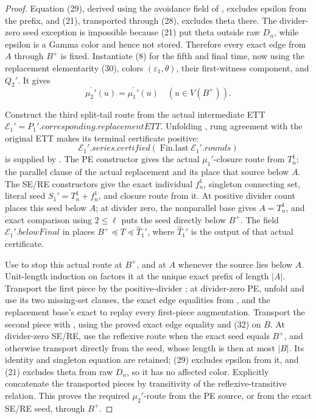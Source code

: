 \begin{proof}
Equation (29), derived using the avoidance field of
, excludes epsilon from the prefix, and (21),
transported through (28), excludes theta there.  The divider-zero seed exception is
impossible because (21) put theta outside raw \(D_n\), while epsilon is a
Gamma color and hence not stored.  Therefore every exact edge from \(A\)
through \(B^+\) is fixed.  Instantiate (8) for the fifth and final time,
now using the replacement elementarity (30), colors
\((\varepsilon_1,\theta)\), their first-witness component, and \(Q_2'\).
It gives
\[
 \overline{\mu_2'}(u)=\overline{\mu_1'}(u)
                           \quad(u\in V(B^+)).                 \tag{32}
\]

Construct the third split-tail route from the actual intermediate ETT
\(\mathcal E_1'=P_1'.\mathit{corresponding}.\mathit{replacementETT}\).
Unfolding , rung agreement with
the original ETT makes its terminal certificate positive:
\[
 \mathcal E_1'.\mathit{series}.\mathit{certified}
       (\operatorname{Fin.last}\mathcal E_1'.\mathit{rounds})
\]
is supplied by .  The PE constructor gives the
actual \(\mu_1'\)-closure route from \(T_n^1\); the parallel clause of
the actual replacement  and its
 place that source below \(A\).  The SE/RE
constructors give the exact individual \(f_n^1\), singleton connecting
set, literal seed \(S_1'=T_n^1+f_n^1\), and closure route from it.  At
positive divider count  places
this seed below \(A\); at divider zero, the nonparallel base gives
\(A=T_n^1\), and exact comparison using \(2\leq\ell\) puts the seed
directly below \(B^+\).  The field
\(\mathcal E_1'.\mathit{belowFinal}\) in
 places
\(B^+\preccurlyeq T\preccurlyeq\widehat T_1'\), where
\(\widehat T_1'\) is the output of that actual certificate.

Use  to stop this actual
route at \(B^+\), and at \(A\) whenever the source lies below \(A\).
Unit-length induction on  factors
it at the unique exact prefix of length \(|A|\).  Transport the first
piece by the positive-divider ; at
divider-zero PE, unfold  and use its two
 missing-set clauses, the exact edge equalities from
, and the replacement base's exact
 to replay every first-piece augmentation.
Transport the
second piece with
, using the
proved exact edge equality and (32) on \(B\).  At divider-zero SE/RE, use
the reflexive route when the exact seed equals \(B^+\), and otherwise
transport directly from the seed, whose length is then at most \(|B|\).
Its identity and singleton equation are retained; (29) excludes epsilon
from it, and (21) excludes theta from raw \(D_n\), so it has no affected
color.  Explicitly
concatenate the transported pieces by transitivity of the
reflexive-transitive relation.  This proves the required \(\mu_2'\)-route
from the PE source, or from the exact SE/RE seed, through \(B^+\).


\end{proof}
